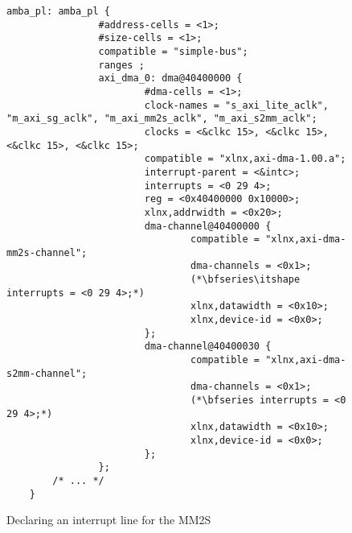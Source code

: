 \begin{figure}[ht!]
\centering
\begin{lstlisting}[style=basic]
        amba_pl: amba_pl {
                #address-cells = <1>;
                #size-cells = <1>;
                compatible = "simple-bus";
                ranges ;
                axi_dma_0: dma@40400000 {
                        #dma-cells = <1>;
                        clock-names = "s_axi_lite_aclk", "m_axi_sg_aclk", "m_axi_mm2s_aclk", "m_axi_s2mm_aclk";
                        clocks = <&clkc 15>, <&clkc 15>, <&clkc 15>, <&clkc 15>;
                        compatible = "xlnx,axi-dma-1.00.a";
                        interrupt-parent = <&intc>;
                        interrupts = <0 29 4>;
                        reg = <0x40400000 0x10000>;
                        xlnx,addrwidth = <0x20>;
                        dma-channel@40400000 {
                                compatible = "xlnx,axi-dma-mm2s-channel";
                                dma-channels = <0x1>;
                                (*\bfseries\itshape interrupts = <0 29 4>;*)
                                xlnx,datawidth = <0x10>;
                                xlnx,device-id = <0x0>;
                        };
                        dma-channel@40400030 {
                                compatible = "xlnx,axi-dma-s2mm-channel";
                                dma-channels = <0x1>;
                                (*\bfseries interrupts = <0 29 4>;*)
                                xlnx,datawidth = <0x10>;
                                xlnx,device-id = <0x0>;
                        };
                };
		/* ... */
	}
\end{lstlisting}
\caption{Declaring an interrupt line for the MM2S}
\label{lst:dma-int}
\end{figure}



